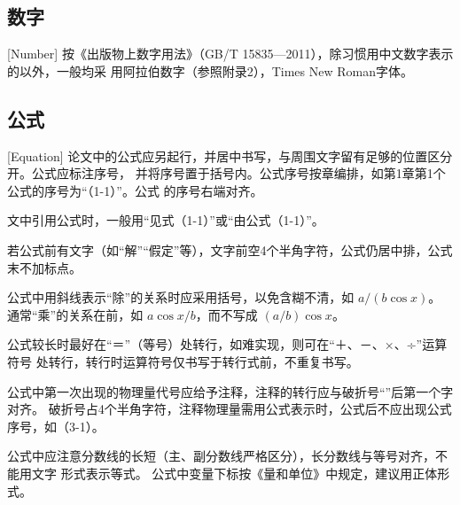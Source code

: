 




\subsection{数字}[Number]
按《出版物上数字用法》（GB/T 15835—2011），除习惯用中文数字表示的以外，一般均采
用阿拉伯数字（参照附录2），Times New Roman字体。

\subsection{公式}[Equation]
论文中的公式应另起行，并居中书写，与周围文字留有足够的位置区分开。公式应标注序号，
并将序号置于括号内。公式序号按章编排，如第1章第1个公式的序号为“（1-1）”。公式
的序号右端对齐。

文中引用公式时，一般用“见式（1-1）”或“由公式（1-1）”。

若公式前有文字（如“解”“假定”等），文字前空4个半角字符，公式仍居中排，公式末不加标点。

公式中用斜线表示“除”的关系时应采用括号，以免含糊不清，如 $a/(b\cos x)$。\\
通常“乘”的关系在前，如 $a\cos x/b$，而不写成 $(a/b)\cos x$。


公式较长时最好在“＝”（等号）处转行，如难实现，则可在“＋、－、×、÷”运算符号
处转行，转行时运算符号仅书写于转行式前，不重复书写。

公式中第一次出现的物理量代号应给予注释，注释的转行应与破折号“\cndash”后第一个字对齐。
破折号占4个半角字符，注释物理量需用公式表示时，公式后不应出现公式序号，如（3-1）。

公式中应注意分数线的长短（主、副分数线严格区分），长分数线与等号对齐，不能用文字
形式表示等式。
公式中变量下标按《量和单位》中规定，建议用正体形式。

